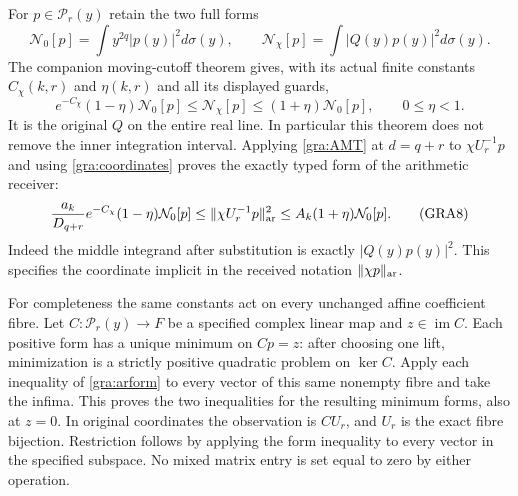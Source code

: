 \documentclass[11pt,a4paper]{article}
\begin{document}
For $p\in\mathcal P_r(y)$ retain the two full forms
\[
 \mathcal N_0[p]=\int y^{2q}|p(y)|^2d\sigma(y),\qquad
 \mathcal N_\chi[p]=\int|Q(y)p(y)|^2d\sigma(y).
\]
The companion moving-cutoff theorem gives, with its actual finite
constants $C_\chi(k,r)$ and $\eta(k,r)$ and all its displayed guards,
\begin{equation}
 e^{-C_\chi}(1-\eta)\mathcal N_0[p]
 \le\mathcal N_\chi[p]\le(1+\eta)\mathcal N_0[p],
 \qquad 0\le\eta<1.
 \tag{GRA7}\label{gra:analyticform}
\end{equation}
It is the original $Q$ on the entire real line.  In particular this
theorem does not remove the inner integration interval.  Applying
\eqref{gra:AMT} at $d=q+r$ to $\chi U_r^{-1}p$ and using
\eqref{gra:coordinates} proves the exactly typed form of the arithmetic
receiver:
\begin{equation}
 \frac{a_k}{D_{q+r}}e^{-C_\chi}(1-\eta)\mathcal N_0[p]
 \le\|\chi U_r^{-1}p\|_{\rm ar}^2
 \le A_k(1+\eta)\mathcal N_0[p].
 \tag{GRA8}\label{gra:arform}
\end{equation}
Indeed the middle integrand after substitution is exactly $|Q(y)p(y)|^2$.
This specifies the coordinate implicit in the received notation
$\|\chi p\|_{\rm ar}$.

For completeness the same constants act on every unchanged affine
coefficient fibre.  Let $C:\mathcal P_r(y)\to F$ be a specified complex
linear map and $z\in\operatorname{im}C$.  Each positive form has a unique
minimum on $Cp=z$: after choosing one lift, minimization is a strictly
positive quadratic problem on $\ker C$.  Apply each inequality of
\eqref{gra:arform} to every vector of this same nonempty fibre and take
the infima.  This proves the two inequalities for the resulting minimum
forms, also at $z=0$.  In original coordinates the observation is
$C U_r$, and $U_r$ is the exact fibre bijection.  Restriction follows by
applying the form inequality to every vector in the specified subspace.
No mixed matrix entry is set equal to zero by either operation.
\end{document}
